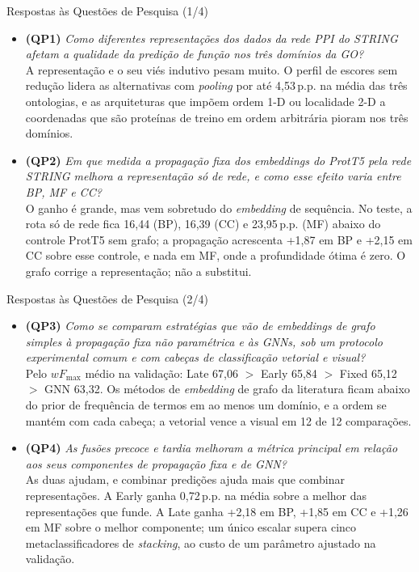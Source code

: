 \documentclass[aspectratio=169,11pt]{beamer}
\newcommand{\wF}{wF_{\max}}
\begin{document}
\begin{frame}{Respostas às Questões de Pesquisa (1/4)}
  \begin{itemize}\setlength{\itemsep}{0.9em}\small
    \item<+-> \textbf{(QP1)} {\scriptsize\textit{Como diferentes representações dos dados da rede PPI do STRING afetam a qualidade da predição de função nos três domínios da GO?}}\\[0.2em]
      A representação e o seu viés indutivo pesam muito. O perfil de escores sem redução lidera as alternativas com \textit{pooling} por até 4,53\,p.p. na média das três ontologias, e as arquiteturas que impõem ordem 1-D ou localidade 2-D a coordenadas que são proteínas de treino em ordem arbitrária pioram nos três domínios.
    \item<+-> \textbf{(QP2)} {\scriptsize\textit{Em que medida a propagação fixa dos \textit{embeddings} do ProtT5 pela rede STRING melhora a representação só de rede, e como esse efeito varia entre BP, MF e CC?}}\\[0.2em]
      O ganho é grande, mas vem sobretudo do \textit{embedding} de sequência. No teste, a rota só de rede fica 16,44 (BP), 16,39 (CC) e 23,95\,p.p. (MF) abaixo do controle ProtT5 sem grafo; a propagação acrescenta +1,87 em BP e +2,15 em CC sobre esse controle, e nada em MF, onde a profundidade ótima é zero. O grafo corrige a representação; não a substitui.
  \end{itemize}
\end{frame}

\begin{frame}{Respostas às Questões de Pesquisa (2/4)}
  \begin{itemize}\setlength{\itemsep}{0.9em}\small
    \item<+-> \textbf{(QP3)} {\scriptsize\textit{Como se comparam estratégias que vão de \textit{embeddings} de grafo simples à propagação fixa não paramétrica e às GNNs, sob um protocolo experimental comum e com cabeças de classificação vetorial e visual?}}\\[0.2em]
      Pelo $\wF$ médio na validação: Late 67,06 $>$ Early 65,84 $>$ Fixed 65,12 $>$ GNN 63,32. Os métodos de \textit{embedding} de grafo da literatura ficam abaixo do prior de frequência de termos em ao menos um domínio, e a ordem se mantém com cada cabeça; a vetorial vence a visual em 12 de 12 comparações.
    \item<+-> \textbf{(QP4)} {\scriptsize\textit{As fusões precoce e tardia melhoram a métrica principal em relação aos seus componentes de propagação fixa e de GNN?}}\\[0.2em]
      As duas ajudam, e combinar predições ajuda mais que combinar representações. A Early ganha 0,72\,p.p. na média sobre a melhor das representações que funde. A Late ganha +2,18 em BP, +1,85 em CC e +1,26 em MF sobre o melhor componente; um único escalar supera cinco metaclassificadores de \textit{stacking}, ao custo de um parâmetro ajustado na validação.
  \end{itemize}
\end{frame}
\end{document}
